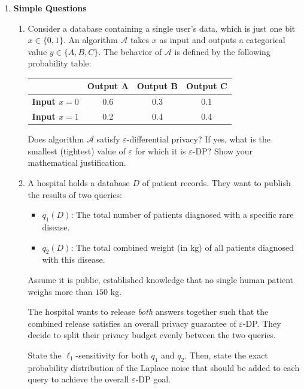 \documentclass[12pt]{article}
\begin{document}
\begin{enumerate}

\item {\bf Simple Questions}
\begin{enumerate}
    \item   Consider a database containing a single user's data, which is just one bit $x \in \{0, 1\}$. An algorithm $\mathcal{A}$ takes $x$ as input and outputs a categorical value $y \in \{A, B, C\}$. The behavior of $\mathcal{A}$ is defined by the following probability table:
\begin{center}
\begin{tabular}{lccc}
\toprule
 & \textbf{Output A} & \textbf{Output B} & \textbf{Output C} \\
\midrule
\textbf{Input $x = 0$} & 0.6 & 0.3 & 0.1 \\
\textbf{Input $x = 1$} & 0.2 & 0.4 & 0.4 \\
\bottomrule
\end{tabular}
\end{center}
Does algorithm $\mathcal{A}$ satisfy $\varepsilon$-differential privacy? If yes, what is the smallest (tightest) value of $\varepsilon$ for which it is $\varepsilon$-DP? Show your mathematical justification.

\item  A hospital holds a database $D$ of patient records. They want to publish the results of two queries:
\begin{itemize}
    \item $q_1(D)$: The total number of patients diagnosed with a specific rare disease.
    \item $q_2(D)$: The total combined weight (in kg) of all patients diagnosed with this disease. 
\end{itemize}
Assume it is public, established knowledge that no single human patient weighs more than $150$ kg. 

The hospital wants to release \textit{both} answers together such that the combined release satisfies an overall privacy guarantee of $\varepsilon$-DP. They decide to split their privacy budget evenly between the two queries. 

State the $\ell_1$-sensitivity for both $q_1$ and $q_2$. Then, state the exact probability distribution of the Laplace noise that should be added to each query to achieve the overall $\varepsilon$-DP goal.



\end{enumerate}
\end{enumerate}
\end{document}
